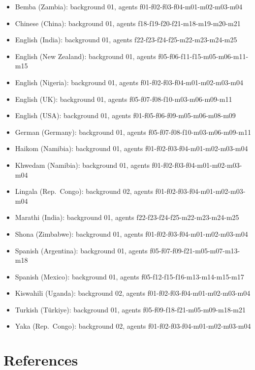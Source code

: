 \documentclass[
  man,floatsintext]{apa7}
\providecommand{\tightlist}{%
  \setlength{\itemsep}{0pt}\setlength{\parskip}{0pt}}
\begin{document}
\begin{itemize}
\tightlist
\item
  Bemba (Zambia): background 01, agents f01-f02-f03-f04-m01-m02-m03-m04
\item
  Chinese (China): background 01, agents f18-f19-f20-f21-m18-m19-m20-m21
\item
  English (India): background 01, agents f22-f23-f24-f25-m22-m23-m24-m25
\item
  English (New Zealand): background 01, agents f05-f06-f11-f15-m05-m06-m11-m15
\item
  English (Nigeria): background 01, agents f01-f02-f03-f04-m01-m02-m03-m04
\item
  English (UK): background 01, agents f05-f07-f08-f10-m03-m06-m09-m11
\item
  English (USA): background 01, agents f01-f05-f06-f09-m05-m06-m08-m09
\item
  German (Germany): background 01, agents f05-f07-f08-f10-m03-m06-m09-m11
\item
  Hai\textbar\textbar kom (Namibia): background 01, agents f01-f02-f03-f04-m01-m02-m03-m04
\item
  Khwedam (Namibia): background 01, agents f01-f02-f03-f04-m01-m02-m03-m04
\item
  Lingala (Rep.~Congo): background 02, agents f01-f02-f03-f04-m01-m02-m03-m04
\item
  Marathi (India): background 01, agents f22-f23-f24-f25-m22-m23-m24-m25
\item
  Shona (Zimbabwe): background 01, agents f01-f02-f03-f04-m01-m02-m03-m04
\item
  Spanish (Argentina): background 01, agents f05-f07-f09-f21-m05-m07-m13-m18
\item
  Spanish (Mexico): background 01, agents f05-f12-f15-f16-m13-m14-m15-m17
\item
  Kiswahili (Uganda): background 02, agents f01-f02-f03-f04-m01-m02-m03-m04
\item
  Turkish (Türkiye): background 01, agents f05-f09-f18-f21-m05-m09-m18-m21
\item
  Yaka (Rep.~Congo): background 02, agents f01-f02-f03-f04-m01-m02-m03-m04
\end{itemize}

\section{References}\label{references}

\begingroup
\setlength{\parindent}{-0.5in}
\setlength{\leftskip}{0.5in}
\end{document}
